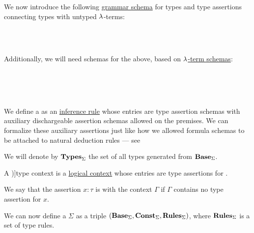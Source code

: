 \begin{definition}
\begin{thmenum}[resume=def:simple_type_system]
     We now introduce the following \hyperref[def:formal_grammar/schema]{grammar schema} for types and type assertions connecting types with untyped \( \mathrm{\lambda} \)-terms:
    \begin{bnf*}
           { \bnfsp \bnftsq{\( \synimplies \)} \bnfsp {}} \\
                 { \bnfor {}} \\
       { \bnfsp \bnftsq{\( : \)} \bnfsp {}}
    \end{bnf*}

    Additionally, we will need schemas for the above, based on \hyperref[def:lambda_term_schema]{\( \mathrm{\lambda} \)-term schemas}:
    \begin{bnf*}
            {} \\
           { \bnfsp \bnftsq{\( \synimplies \)} \bnfsp {}} \\
                 { \bnfor {} \bnfor {}} \\
       { \bnfsp \bnftsq{\( : \)} \bnfsp {}}
    \end{bnf*}

     We define a  as an \hyperref[def:inference_rule]{inference rule} whose entries are type assertion schemas with auxiliary dischargeable assertion schemas allowed on the premises. We can formalize these auxiliary assertions just like how we allowed formula schemas to be attached to natural deduction rules --- see 

     We will denote by \( \op*{Types}_\Sigma \) the set of all types generated from \( \op*{Base}_\Sigma \).

     A \term[en=type-context (\cite[def. 2A5]{Hindley1997STT})]{type context} is a \hyperref[def:logical_context]{logical context} whose entries are type assertions for  .

    We say that the assertion \( x: \tau \) is  with the context \( \Gamma \) if \( \Gamma \) contains no type assertion for \( x \).

     We can now define a  \( \Sigma \) as a triple \( (\op*{Base}_\Sigma, \op*{Const}_\Sigma, \op*{Rules}_\Sigma) \), where \( \op*{Rules}_\Sigma \) is a set of type rules.
  \end{thmenum}
\end{definition}
